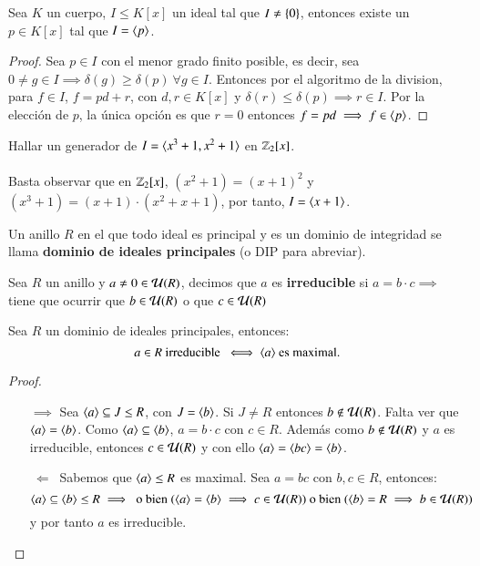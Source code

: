 \begin{thm}
    Sea $K$ un cuerpo, $I \leq K[x]$ un ideal tal que $I \neq \left\{0\right\}$, entonces existe un $p \in K[x]$ tal que $I = \langle p\rangle$.
\end{thm}

\begin{proof}
    Sea $p \in I$ con el menor grado finito posible, es decir, sea $0 \neq g \in I \implies \delta(g) \geq \delta(p)\ \forall g \in I$. Entonces por el algoritmo de la division, para $f \in I$, $f = pd + r$, con $d, r \in K[x]$ y $\delta(r) \leq \delta(p) \implies r \in I$. Por la elección de $p$, la única opción es que $ r = 0 $ entonces $f = pd \implies f \in \langle p\rangle$.
\end{proof}

\begin{ex}[H1.25]
    Hallar un generador de $I = \langle x^3 + 1, x^2 + 1\rangle$ en $\mathbb{Z}_2[x]$.\\\\

    Basta observar que en $\mathbb{Z}_2[x]$, $(x^2 + 1) = (x + 1)^2$ y $(x^3 + 1) = (x + 1) \cdot (x^2 + x + 1)$, por tanto, $I = \langle x + 1\rangle$.
\end{ex}

\begin{dfn}
    Un anillo $R$ en el que todo ideal es principal y es un dominio de integridad se llama \textbf{dominio de ideales principales} (o DIP para abreviar).
\end{dfn}

\begin{dfn}
    Sea $R$ un anillo y $a \neq 0 \in \mathcal{U}(R)$, decimos que $a$ es \textbf{irreducible} si $a = b \cdot c \implies$ tiene que ocurrir que $b\in \mathcal{U}(R)$ o que $c \in \mathcal{U}(R)$
\end{dfn}

\begin{thm}
    Sea $R$ un dominio de ideales principales, entonces:
    $$
        a \in R \text{ irreducible } \iff \langle a\rangle \text{ es maximal.}
    $$
\end{thm}

\begin{proof}$ $
    \begin{itemize}
        \item [$\implies$] Sea $\langle a\rangle \subseteq J \leq R$, con $J = \langle b\rangle$. Si $J \neq R$ entonces $b \notin \mathcal{U}(R)$. Falta ver que $\langle a\rangle = \langle b\rangle$. Como $\langle a\rangle \subseteq \langle b\rangle$, $a = b \cdot c$ con $c \in R$. Además como $b \notin \mathcal{U}(R)$ y $a$ es irreducible, entonces $c \in \mathcal{U}(R)$ y con ello $\langle a\rangle = \langle b c\rangle = \langle b\rangle$.

        \item[$\ \Longleftarrow \ $] Sabemos que $\langle a\rangle \leq R$ es maximal. Sea $a = bc$ con $b, c \in R$, entonces:
        $$
            \langle a\rangle \subseteq \langle b\rangle \leq R \implies \text{ o bien } (\langle a\rangle = \langle b\rangle \implies c \in \mathcal{U}(R)) \text{ o bien } (\langle b\rangle = R \implies b \in \mathcal{U}(R))
        $$
        y por tanto $a$ es irreducible.
    \end{itemize}
\end{proof}

